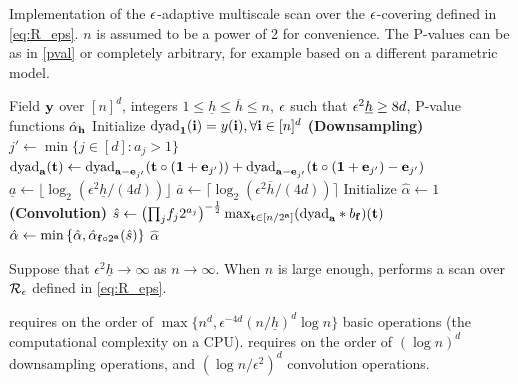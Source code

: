 \documentclass[twoside,11pt]{article}
\begin{document}
\begin{algorithm}
\caption{Implementation of the $\epsilon$-adaptive multiscale scan over the $\epsilon$-covering defined in \eqref{eq:R_eps}.  $n$ is assumed to be a power of 2 for convenience.  The P-values can be as in \eqref{pval} or completely arbitrary, for example based on a different parametric model.}
\label{alg:eps_rect}
\begin{algorithmic}[1] 
\Require Field $\mathbf{y}$ over $[n]^d$, integers $1 \le \underline h \le \overline h \le n$, $\epsilon$ such that $\epsilon^2 \underline h \ge 8d$, P-value functions $\hat \alpha_{\mathbf{h}}$
\State Initialize $\textrm{dyad}_{\bf 1}(\mathbf{i}) = y(\mathbf{i}), \forall \mathbf{i} \in [n]^d$
 \label{line:start_dyad_loop} {\bf (Downsampling)}
\State $j' \gets \min \{ j \in [d] : a_j > 1 \}$ 
\For{$\tb \in [n/2^\ab]$}
\State \label{line:dyad} $\textrm{dyad}_{\mathbf{a}}(\mathbf{t}) \gets \textrm{dyad}_{\mathbf{a}-\mathbf{e}_{j'}}(\mathbf{t} \circ ({\bf 1} + \mathbf{e}_{j'})) + \textrm{dyad}_{\mathbf{a}-\mathbf{e}_{j'}}(\mathbf{t} \circ ({\bf 1} + \mathbf{e}_{j'}) - \mathbf{e}_{j'})$
\EndFor
\EndFor \label{line:end_dyad_loop}
\State $\underline a \gets \lfloor \log_2 (\epsilon^2 \underline h / (4d)) \rfloor$
\State $\overline a \gets \lceil \log_2 (\epsilon^2 \overline h/(4d)) \rceil$
\State Initialize $\hat \alpha \gets 1$
  {\bf (Convolution)} 
\State \label{line:shat} $\hat s \gets \big( {\textstyle\prod}_j f_j 2^{a_j} \big)^{-\frac 12} \max_{\mathbf{t} \in [n/2^{\mathbf{a}}]} (\textrm{dyad}_{\mathbf{a}} \ast b_{\mathbf{f}})(\mathbf{t})$
\State \label{line:pval} $\hat \alpha \gets \min\left\{ \hat \alpha, \hat \alpha_{\mathbf{f} \circ 2^{\mathbf{a}}} (\hat s) \right\}$
\EndFor
\EndFor
\Ensure $\hat \alpha$
\end{algorithmic}
\end{algorithm}



\begin{proposition}
\label{prop:alg_eps_net}
Suppose that $\epsilon^2 \underline h \rightarrow \infty$ as $n \to \infty$.
When $n$ is large enough,  performs a scan over $\mathcal{R}_\epsilon$ defined in \eqref{eq:R_eps}.
\end{proposition}

\begin{proposition}
\label{prop:eps_time}
 requires on the order of
$
\max\big\{n^d, \epsilon^{-4d} (n/\underline h)^{d} \log n \big\}
$
basic operations (the computational complexity on a CPU).
 requires on the order of 
$
(\log n)^d
$
downsampling operations, and 
$
(\log n / \epsilon^2)^d
$
convolution operations.
\end{proposition}
\end{document}
